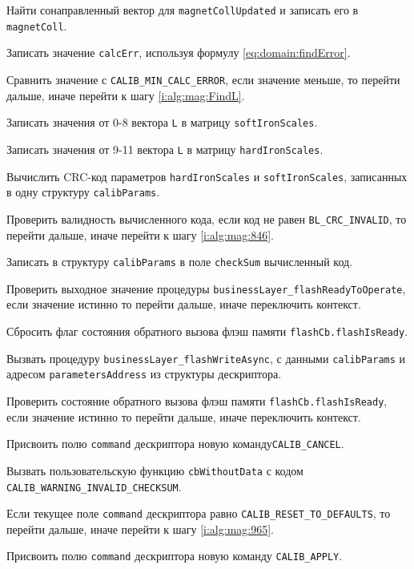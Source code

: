 \begin{enumerate_step}
    \item Найти сонаправленный вектор для \lstinline|magnetCollUpdated| и записать его в \lstinline|magnetColl|.
    \item Записать значение \lstinline|calcErr|, используя формулу \ref{eq:domain:findError}.
    \item Сравнить значение с \lstinline|CALIB_MIN_CALC_ERROR|, если значение меньше, то перейти дальше, иначе перейти к шагу \ref{i:alg:mag:FindL}.
    \item Записать значения от 0-8 вектора \lstinline|L| в матрицу \lstinline|softIronScales|.
    \item Записать значения от 9-11 вектора \lstinline|L| в матрицу \lstinline|hardIronScales|.
    \item Вычислить CRC-код параметров \lstinline|hardIronScales| и \lstinline|softIronScales|, записанных в одну структуру \lstinline|calibParams|.
    \item Проверить валидность вычисленного кода, если код не равен \lstinline|BL_CRC_INVALID|, то перейти дальше, иначе перейти к шагу \ref{i:alg:mag:846}.
    \item Записать в структуру \lstinline|calibParams| в поле \lstinline|checkSum| вычисленный код.
    \item Проверить выходное значение процедуры \lstinline|businessLayer_flashReadyToOperate|, если значение истинно то перейти дальше, иначе переключить контекст.
    \item Сбросить флаг состояния обратного вызова флэш памяти \lstinline|flashCb.flashIsReady|.
    \item Вызвать процедуру \lstinline|businessLayer_flashWriteAsync|, с данными \lstinline|calibParams| и адресом \lstinline|parametersAddress| из структуры дескриптора.
    \item Проверить состояние обратного вызова флэш памяти \lstinline|flashCb.flashIsReady|, если значение истинно то перейти дальше, иначе переключить контекст.
    \item \label{i:alg:mag:846} Присвоить полю \lstinline|command| дескриптора  новую команду\lstinline|CALIB_CANCEL|.
    \item Вызвать пользовательскую функцию \lstinline|cbWithoutData| с кодом \lstinline|CALIB_WARNING_INVALID_CHECKSUM|.
    \item \label{i:alg:mag:1008} Если текущее поле \lstinline|command| дескриптора равно \lstinline|CALIB_RESET_TO_DEFAULTS|, то перейти дальше, иначе перейти к шагу
    \ref{i:alg:mag:965}.
    \item Присвоить полю \lstinline|command| дескриптора  новую команду \lstinline|CALIB_APPLY|.

\end{enumerate_step}
